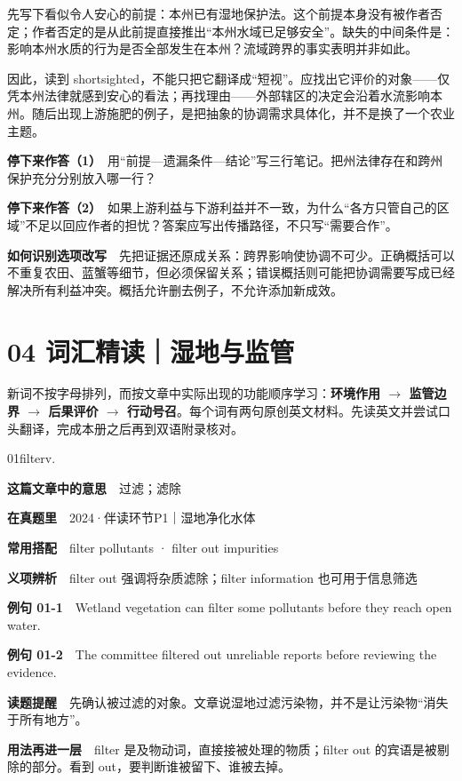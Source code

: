 \documentclass[a4paper,11pt,openany]{report}
\newcommand{\emphasislabel}[1]{\textcolor{leaf}{\CJKsf\bfseries #1}}
\begin{document}
先写下看似令人安心的前提：本州已有湿地保护法。这个前提本身没有被作者否定；作者否定的是从此前提直接推出``本州水域已足够安全''。缺失的中间条件是：影响本州水质的行为是否全部发生在本州？流域跨界的事实表明并非如此。

因此，读到 shortsighted，不能只把它翻译成``短视''。应找出它评价的对象------仅凭本州法律就感到安心的看法；再找理由------外部辖区的决定会沿着水流影响本州。随后出现上游施肥的例子，是把抽象的协调需求具体化，并不是换了一个农业主题。

\textbf{停下来作答（1）}　用``前提---遗漏条件---结论''写三行笔记。把州法律存在和跨州保护充分分别放入哪一行？

\textbf{停下来作答（2）}　如果上游利益与下游利益并不一致，为什么``各方只管自己的区域''不足以回应作者的担忧？答案应写出传播路径，不只写``需要合作''。

\textbf{如何识别选项改写}　先把证据还原成关系：跨界影响使协调不可少。正确概括可以不重复农田、蓝蟹等细节，但必须保留关系；错误概括则可能把协调需要写成已经解决所有利益冲突。概括允许删去例子，不允许添加新成效。

\section{04 词汇精读｜湿地与监管}\label{ux8bcdux6c47ux7cbeux8bfbux6e7fux5730ux4e0eux76d1ux7ba1}

新词不按字母排列，而按文章中实际出现的功能顺序学习：\textbf{环境作用 \(\rightarrow\) 监管边界 \(\rightarrow\) 后果评价 \(\rightarrow\) 行动号召}。每个词有两句原创英文材料。先读英文并尝试口头翻译，完成本册之后再到双语附录核对。

\begin{vocabbox}{01}{filter}{v.}

\textbf{这篇文章中的意思}　过滤；滤除

\textbf{在真题里}　2024·伴读环节P1｜湿地净化水体

\textbf{常用搭配}　filter pollutants · filter out impurities

\textbf{义项辨析}　filter out 强调将杂质滤除；filter information 也可用于信息筛选

\textbf{例句 01-1}　Wetland vegetation can filter some pollutants before they reach open water.

\textbf{例句 01-2}　The committee filtered out unreliable reports before reviewing the evidence.

\emphasislabel{读题提醒}　先确认被过滤的对象。文章说湿地过滤污染物，并不是让污染物``消失于所有地方''。

\textbf{用法再进一层}　filter 是及物动词，直接接被处理的物质；filter out 的宾语是被剔除的部分。看到 out，要判断谁被留下、谁被去掉。

\end{vocabbox}
\end{document}
